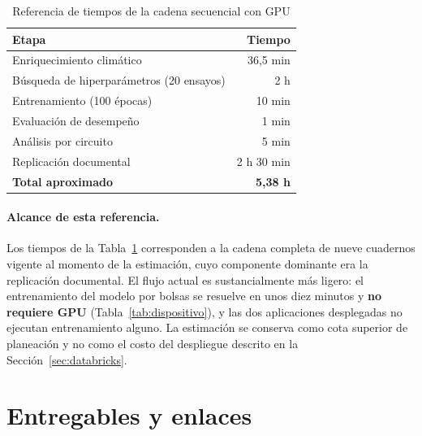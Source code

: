\documentclass[11pt,a4paper]{article}
\begin{document}
\begin{table}[H]
\centering
\caption{Referencia de tiempos de la cadena secuencial con GPU}
\label{tab:tiemposdbx}
\small
\begin{tabularx}{\textwidth}{X r}
\toprule
\textbf{Etapa} & \textbf{Tiempo} \\
\midrule
Enriquecimiento climático & 36,5 min \\
Búsqueda de hiperparámetros (20 ensayos) & 2 h \\
Entrenamiento (100 épocas) & 10 min \\
Evaluación de desempeño & 1 min \\
Análisis por circuito & 5 min \\
Replicación documental & 2 h 30 min \\
\midrule
\textbf{Total aproximado} & \textbf{5,38 h} \\
\bottomrule
\end{tabularx}
\end{table}

\paragraph{Alcance de esta referencia.} Los tiempos de la Tabla~\ref{tab:tiemposdbx}
corresponden a la cadena completa de nueve cuadernos vigente al momento de la estimación, cuyo
componente dominante era la replicación documental. El flujo actual es sustancialmente más
ligero: el entrenamiento del modelo por bolsas se resuelve en unos diez minutos y
\textbf{no requiere GPU} (Tabla~\ref{tab:dispositivo}), y las dos aplicaciones desplegadas no
ejecutan entrenamiento alguno. La estimación se conserva como cota superior de planeación y no
como el costo del despliegue descrito en la Sección~\ref{sec:databricks}.

\section{Entregables y enlaces}
\end{document}
